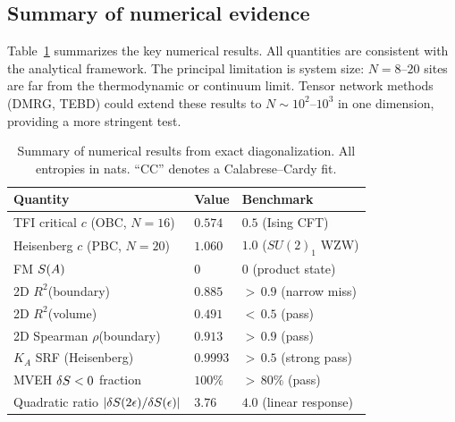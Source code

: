 \subsection{Summary of numerical evidence}
\label{sec:ed-summary}

Table~\ref{tab:numerics} summarizes the key numerical results.
All quantities are consistent with the analytical framework.
The principal limitation is system size: $N = 8$--$20$ sites are far
from the thermodynamic or continuum limit.  Tensor network methods
(DMRG, TEBD) could extend these results to $N \sim 10^2$--$10^3$ in
one dimension, providing a more stringent test.

\begin{table}
\caption{Summary of numerical results from exact diagonalization.
All entropies in nats.  ``CC'' denotes a Calabrese--Cardy fit.
\label{tab:numerics}}
\begin{ruledtabular}
\begin{tabular}{lll}
Quantity & Value & Benchmark \\ \hline
TFI critical $c$ (OBC, $N\!=\!16$) & $0.574$ & $0.5$ (Ising CFT) \\
Heisenberg $c$ (PBC, $N\!=\!20$) & $1.060$ & $1.0$ ($SU(2)_1$ WZW) \\
FM $S(A)$ & $0$ & $0$ (product state) \\
2D $R^2$(boundary) & $0.885$ & ${>}\,0.9$ (narrow miss) \\
2D $R^2$(volume) & $0.491$ & ${<}\,0.5$ (pass) \\
2D Spearman $\rho$(boundary) & $0.913$ & ${>}\,0.9$ (pass) \\
$K_A$ SRF (Heisenberg) & $0.9993$ & ${>}\,0.5$ (strong pass) \\
MVEH $\delta S < 0$ fraction & $100\%$ & ${>}\,80\%$ (pass) \\
Quadratic ratio $|\delta S(2\epsilon)/\delta S(\epsilon)|$
  & $3.76$ & $4.0$ (linear response) \\
\end{tabular}
\end{ruledtabular}
\end{table}
